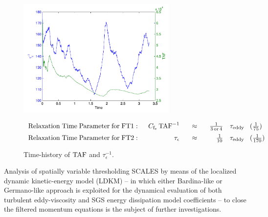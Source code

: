 \begin{figure}[t]
  \vspace{-20pt}
\begin{center}
  \includegraphics[width=0.7\textwidth]{figures/TAF__TauEps.pdf}\\
\end{center}
  \vspace{-20pt}
  \caption{Time-history of ${\rm TAF}$ and $\tau_{\epsilon}^{-1}$.}
  \label{fig:FThistory}

  \vspace{-20pt}
\begin{equation}
 \nonumber
\begin{array}{lrcrl}

\vspace*{.2cm}

{\rm Relaxation \; Time \; Parameter \; for \; FT1:} \;\; &
C_{{\rm f}_{\epsilon}} \, {\rm TAF}^{-1} &
\;\;\;
\approx
\;\;\;&
\frac 1 {3 \, {\rm or} \, 4}&
\tau_{\rm eddy} \;\;\; (\frac 1 {75})\\ %


{\rm Relaxation \; Time \; Parameter \; for \; FT2:} \;\;&
\tau_{\epsilon}&
\;\;\;
\approx
\;\;\;&
\frac 1 {10}&
\tau_{\rm eddy} \;\;\; (\frac 1 {170})  %

\end{array}
\end{equation}
  \vspace{-12pt}

\end{figure}




Analysis of spatially variable thresholding SCALES by means of the localized dynamic kinetic-energy model (LDKM)
-- in which either Bardina-like or Germano-like approach is exploited for the dynamical evaluation of both
turbulent eddy-viscosity and SGS energy dissipation model coefficients --
to close the filtered momentum equations
is the subject of further investigations.


